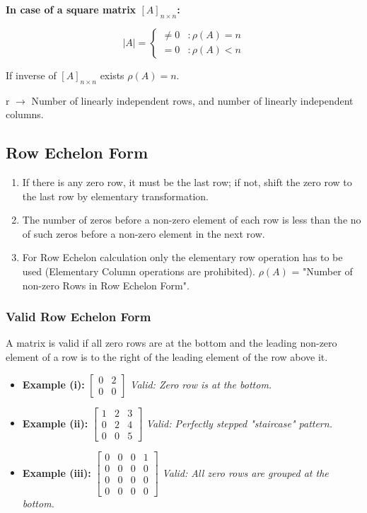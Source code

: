 \textbf{In case of a square matrix $[A]_{n \times n}$:}

$$ |A| = \begin{cases} \neq 0 & : \rho(A) = n \\ = 0 & : \rho(A) < n \end{cases} $$

If inverse of $[A]_{n \times n}$ exists $\rho (A) = n$.

r $\longrightarrow$ Number of linearly independent rows, and number of linearly independent columns.

\subsection{Row Echelon Form}

\begin{enumerate}
    \item If there is any zero row, it must be the last row; if not, shift the zero row to the last row by elementary transformation.
    \item The number of zeros before a non-zero element of each row is less than the no of such zeros before a non-zero element in the next row.
    \item For Row Echelon calculation only the elementary row operation has to be used (Elementary Column operations are prohibited). $\rho (A)$ = "Number of non-zero Rows in Row Echelon Form".
\end{enumerate}

\subsubsection{Valid Row Echelon Form}
A matrix is valid if all zero rows are at the bottom and the leading non-zero element of a row is to the right of the leading element of the row above it.

\begin{itemize}
    \item \textbf{Example (i):} $\begin{bmatrix} 0 & 2 \\ 0 & 0 \end{bmatrix}$
    \quad \textit{Valid: Zero row is at the bottom.}

    \item \textbf{Example (ii):} $\begin{bmatrix} 1 & 2 & 3 \\ 0 & 2 & 4 \\ 0 & 0 & 5 \end{bmatrix}$
    \quad \textit{Valid: Perfectly stepped "staircase" pattern.}

    \item \textbf{Example (iii):} $\begin{bmatrix} 0 & 0 & 0 & 1 \\ 0 & 0 & 0 & 0 \\ 0 & 0 & 0 & 0 \\ 0 & 0 & 0 & 0 \end{bmatrix}$
    \quad \textit{Valid: All zero rows are grouped at the bottom.}
\end{itemize}

